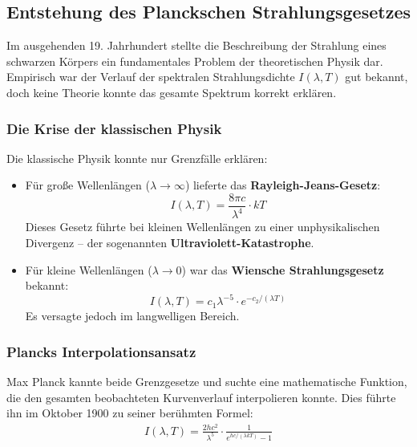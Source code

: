 \vspace{-1.2em}

\subsection{Entstehung des Planckschen Strahlungsgesetzes}

Im ausgehenden 19. Jahrhundert stellte die Beschreibung der Strahlung eines schwarzen Körpers ein fundamentales Problem der theoretischen Physik dar. Empirisch war der Verlauf der spektralen Strahlungsdichte \( I(\lambda, T) \) gut bekannt, doch keine Theorie konnte das gesamte Spektrum korrekt erklären.
\newpage
\noindent
\subsubsection{Die Krise der klassischen Physik}

Die klassische Physik konnte nur Grenzfälle erklären:

\begin{itemize}
	\item Für große Wellenlängen (\(\lambda \to \infty\)) lieferte das \textbf{Rayleigh-Jeans-Gesetz}:
	\[
	I(\lambda, T) = \frac{8\pi c}{\lambda^4} \cdot kT
	\]
	Dieses Gesetz führte bei kleinen Wellenlängen zu einer unphysikalischen Divergenz – der sogenannten \textbf{Ultraviolett-Katas\-trophe}.
	
	\item Für kleine Wellenlängen (\(\lambda \to 0\)) war das \textbf{Wiensche Strahlungsgesetz} bekannt:
	\[
	I(\lambda, T) = c_1 \lambda^{-5} \cdot e^{-c_2/(\lambda T)}
	\]
	Es versagte jedoch im langwelligen Bereich.
\end{itemize}

\subsubsection{Plancks Interpolationsansatz}

Max Planck kannte beide Grenzgesetze und suchte eine mathematische Funktion, die den gesamten beobachteten Kurvenverlauf interpolieren konnte. Dies führte ihn im Oktober 1900 zu seiner berühmten Formel:
\begin{align}
	I(\lambda, T) = \frac{2hc^2}{\lambda^5} \cdot \frac{1}{e^{hc/(\lambda kT)} - 1}
\end{align}

